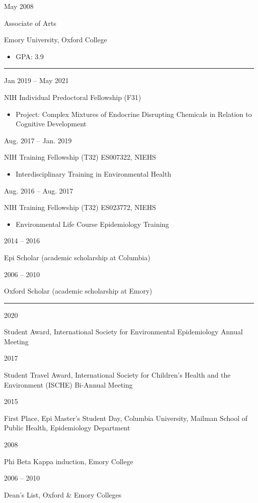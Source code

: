 \documentclass[a4paper,10pt]{article}
\newlength{\cvcolumngapwidth}
\newlength{\cvleftcolumnwidth}
\newlength{\cvrightcolumnwidth}
\newcommand{\cvsectionstyle}[1]{{\normalsize\cvsectionfont\textcolor{cvsectioncolor}{#1}}}
\newcommand{\cvtitlestyle}[1]{{\large\cvtitlefont\textcolor{cvtitlecolor}{#1}}}
\newcommand{\cvdurationstyle}[1]{{\small\cvdurationfont\textcolor{cvdurationcolor}{#1}}}
\newlength{\cvafteritemskipamount}
\newlength{\cvaftersectionskipamount}
\newlength{\cvaftertitleskipamount}
\newlength{\cvparskip}
\newcommand{\cvsection}[1]{
    \begin{minipage}[t]{\cvleftcolumnwidth}
        \raggedleft\cvsectionstyle{#1}
    \end{minipage}%
    \hspace{\cvcolumngapwidth}%
    \begin{minipage}[t]{\cvrightcolumnwidth}
        \textcolor{cvrulecolor}{\rule{\cvrightcolumnwidth}{0.3mm}}
    \end{minipage}

    \vspace{\cvaftersectionskipamount}
}
\newcommand{\cvitem}[2]{
    \begin{minipage}[t]{\cvleftcolumnwidth}
        \raggedleft #1
    \end{minipage}%
    \hspace{\cvcolumngapwidth}%
    \begin{minipage}[t]{\cvrightcolumnwidth}
        \setlength{\parskip}{\cvparskip} #2
    \end{minipage}

    \vspace{\cvafteritemskipamount}
}
\newcommand{\cvtitle}[1]{
    \cvtitlestyle{#1}

    \vspace{\cvaftertitleskipamount}
    \vspace{-\cvparskip}
}
\begin{document}
\cvitem{
    \cvdurationstyle{May 2008}
}{
    \cvtitle{Associate of Arts}

    Emory University, Oxford College
    \begin{itemize}[leftmargin=*]
	\item GPA: 3.9
    \end{itemize}
}


\cvsection{FELLOWSHIPS \& SCHOLARSHIPS}

\cvitem{
    \cvdurationstyle{Jan 2019 -- May 2021}
}{
    NIH Individual Predoctoral Fellowship (F31)
    \begin{itemize}[leftmargin=*]
    	\item Project: Complex Mixtures of Endocrine Disrupting Chemicals in Relation to Cognitive Development
    \end{itemize}
}
\cvitem{
    \cvdurationstyle{Aug. 2017 -- Jan. 2019}
}{
    NIH Training Fellowship (T32) ES007322, NIEHS
    \begin{itemize}[leftmargin=*]
     \item Interdisciplinary Training in Environmental Health
    \end{itemize}
    }
\cvitem{
    \cvdurationstyle{Aug. 2016 -- Aug. 2017}
}{
    NIH Training Fellowship (T32) ES023772, NIEHS
    \begin{itemize}[leftmargin=*]
     \item Environmental Life Course Epidemiology Training
    \end{itemize}
    }
\cvitem{
    \cvdurationstyle{2014 -- 2016}
}{
    Epi Scholar (academic scholarship at Columbia)
}
\cvitem{
    \cvdurationstyle{2006 -- 2010}
}{
    Oxford Scholar (academic scholarship at Emory)
}

\cvsection{HONORS}
\cvitem{
    \cvdurationstyle{2020}
}{
    Student Award, International Society for Environmental Epidemiology Annual Meeting
}
\cvitem{
    \cvdurationstyle{2017}
}{
    Student Travel Award, International Society for Children’s Health and the Environment (ISCHE) Bi-Annual Meeting
}
\cvitem{
    \cvdurationstyle{2015}
}{
   First Place, Epi Master’s Student Day, Columbia University, Mailman School of Public Health, Epidemiology Department
}
\cvitem{
    \cvdurationstyle{2008}
}{
    Phi Beta Kappa induction, Emory College
}
\cvitem{
    \cvdurationstyle{2006 -- 2010}
}{
    Dean's List, Oxford \& Emory Colleges}

\end{document}
